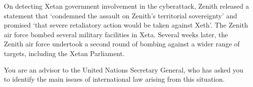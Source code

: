 \begin{tutorialquestion}
    On detecting Xetan government involvement in the cyberattack, Zenith released a statement that `condemned the assault on Zenith's territorial sovereignty' and promised `that severe retaliatory action would be taken against Xeth'. The Zenith air force bombed several military facilities in Xeta. Several weeks later, the Zenith air force undertook a second round of bombing against a wider range of targets, including the Xetan Parliament. 
    
    \vspace{\baselineskip}
    
    You are an advisor to the United Nations Secretary General, who has asked you to identify the main issues of international law arising from this situation.

\end{tutorialquestion}

